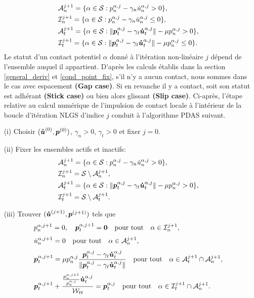 \begin{align*}
&{\cal A}_{n}^{j+1}=\{\alpha\in {\cal S}:p^{\alpha,j}_n - \gamma_n \dot{u}^{\alpha,j}_n > 0\},\\
&{\cal I}_{n}^{j+1}=\{\alpha\in {\cal S}:p^{\alpha,j}_n - \gamma_n \dot{u}^{\alpha,j}_n \leq 0\},\\
&{\cal A}_{t}^{j+1}=\{\alpha\in {\cal S}:\|\boldsymbol{p}^{\alpha,j}_t - \gamma_t \boldsymbol{\dot{u}}^{\alpha,j}_t\| - \mu p^{\alpha,j}_n > 0\},\\
&{\cal I}_{t}^{j+1}=\{\alpha\in {\cal S}:\|\boldsymbol{p}^{\alpha,j}_t - \gamma_t \boldsymbol{\dot{u}}^{\alpha,j}_t\| - \mu p^{\alpha,j}_n \leq 0 \}.
\end{align*}
\noindent Le statut d'un contact potentiel $ \alpha $ donné à l'itération non-linéaire $ j $ dépend de l'ensemble auquel il appartient. D'après les calculs établis dans la section \ref{general_deriv} et \ref{cond_point_fix}, s'il n'y a aucun contact, nous sommes dans le cas avec espacement \textbf{(Gap case)}. Si en revanche il y a contact, soit son statut est adhérant \textbf{(Stick case)} ou bien alors glissant \textbf{(Slip case)}. Ci-après, l'étape relative au calcul numérique de l'impulsion de contact locale à l'intérieur de la boucle d'itération NLGS d'indice $ j $ conduit à l'algorithme PDAS suivant.

\qquad(i) Choisir $(\boldsymbol{\dot{u}}^{(0)},\boldsymbol{p}^{(0)})$, $\gamma_{n}>0$, $\gamma_{t}>0$ et fixer $j=0$.

\qquad(ii) Fixer les ensembles actifs et inactifs:
\begin{align*}
&{\cal A}_{n}^{j+1}=\{\alpha\in {\cal S}:p^{\alpha,j}_n - \gamma_n \dot{u}^{\alpha,j}_n > 0\},\\
&{\cal I}_{n}^{j+1}={\cal S}\setminus {\cal A}_{n}^{j+1},\\
&{\cal A}_{t}^{j+1}=\{\alpha\in {\cal S}:\|\boldsymbol{p}^{\alpha,j}_t - \gamma_t \boldsymbol{\dot{u}}^{\alpha,j}_t\| - \mu p^{\alpha,j}_n > 0\},\\
&{\cal I}_{t}^{j+1}={\cal S}\setminus {\cal A}_{t}^{j+1}.
\end{align*}

\qquad(iii) Trouver $(\boldsymbol{\dot{u}}^{(j+1) },\boldsymbol{p}^{(j+1) })$ tels que
\begin{eqnarray}
&\label{Inu_epdas}p^{\alpha,j+1}_{n}=0, \quad \boldsymbol{p}^{\alpha,j+1}_{t}=\mbox{\boldmath{$0$}} \quad {\rm pour \ tout} \quad \alpha\in {\cal I}_{n}^{j+1},\\[1mm]
&\label{Anu_epdas}\dot{u}^{\alpha,j+1}_{n}=0 \quad {\rm pour \ tout} \quad \alpha \in {\cal A}_{n}^{j+1},\\[1mm]
&\label{Atau_epdas}\boldsymbol{p}_{t}^{\alpha,j+1} =\mu p^{\alpha,j}_n \frac{\boldsymbol{p}^{\alpha,j}_t - \gamma_t \boldsymbol{\dot{u}}^{\alpha,j}_t}{\|\boldsymbol{p}^{\alpha,j}_t - \gamma_t \boldsymbol{\dot{u}}^{\alpha,j}_t\|} \quad {\rm pour \ tout} \quad \alpha \in {\cal A}_{t}^{j+1}\cap {\cal A}_{n}^{j+1},\\[1mm]
&\label{Itau_epdas}\boldsymbol{p}_{t}^{\alpha,j+1} + \frac{\frac{p^{\alpha,j+1}_n}{p^{\alpha,j}_n}\boldsymbol{\dot{u}}^{\alpha,j}_t}{{\cal W}_{tt}} = \boldsymbol{p}_{t}^{\alpha,j} \quad {\rm pour \ tout} \quad \alpha \in {\cal I}_{t}^{j+1}\cap {\cal A}_{n}^{j+1}.
\end{eqnarray}

